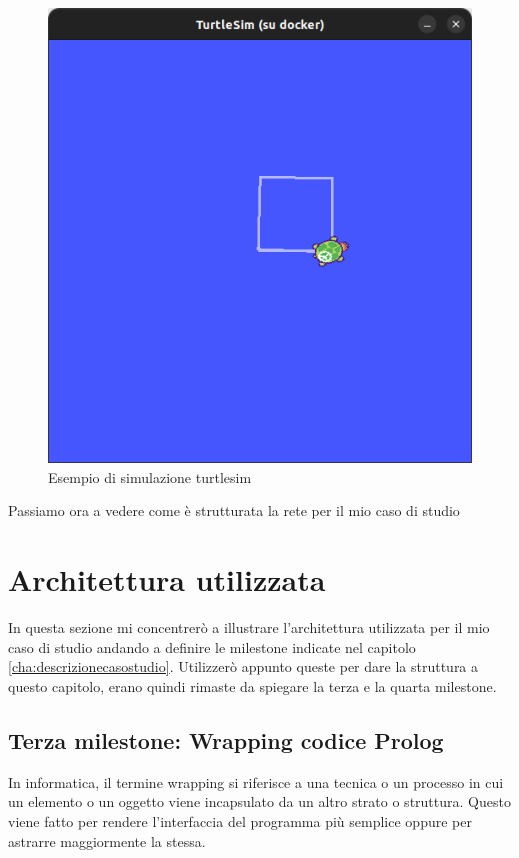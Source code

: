 \begin{figure}[h!]
    \centering
    \includegraphics[scale=0.4]{images/turtlesimes.png}
    \caption{Esempio di simulazione turtlesim}
    \label{fig:turtlesimes}
\end{figure}

Passiamo ora a vedere come è strutturata la rete per il mio caso di studio
\section{Architettura utilizzata}
\label{sec:architettura_utilizzata}
In questa sezione mi concentrerò a illustrare l'architettura utilizzata per il mio caso di studio andando a definire le milestone indicate nel capitolo \ref{cha:descrizionecasostudio}.
Utilizzerò appunto queste per dare la struttura a questo capitolo, erano quindi rimaste da spiegare la terza e la quarta milestone.

\subsection{Terza milestone: Wrapping codice Prolog}
\label{subsec:wrappping}
In informatica, il termine wrapping si riferisce a una tecnica o un processo in cui un elemento o un oggetto viene incapsulato da un altro strato o struttura.
Questo viene fatto per rendere l'interfaccia del programma più semplice oppure per astrarre maggiormente la stessa. 

